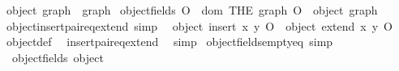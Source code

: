 \begin{isabellebody}
\begin{isamarkuptext}
\end{isamarkuptext}\isamarkuptrue%
%
\isadelimdocument
%
\endisadelimdocument
%
\isatagdocument
%
\isamarkuptrue%
%
\endisatagdocument
{\isafolddocument}%
%
\isadelimdocument
%
\endisadelimdocument
{}\isamarkupfalse%
\ {\isachardoublequoteopen}object\ graph\ {\isacharequal}{\kern0pt}\ graph{\isachardoublequoteclose}%
\isadelimdocument
%
\endisadelimdocument
%
\isatagdocument
%
\isamarkuptrue%
%
\endisatagdocument
{\isafolddocument}%
%
\isadelimdocument
%
\endisadelimdocument
{}\isamarkupfalse%
\ {\isachardoublequoteopen}object{\isacharunderscore}{\kern0pt}fields\ O\ {\isacharequal}{\kern0pt}\ dom\ {\isacharparenleft}{\kern0pt}THE\ graph{\isachardot}{\kern0pt}\ O\ {\isacharequal}{\kern0pt}\ object\ graph{\isacharparenright}{\kern0pt}{\isachardoublequoteclose}\isanewline
\isanewline
{}\isamarkupfalse%
\ object{\isacharunderscore}{\kern0pt}insert{\isacharunderscore}{\kern0pt}pair{\isacharunderscore}{\kern0pt}eq{\isacharunderscore}{\kern0pt}extend\ {\isacharbrackleft}{\kern0pt}simp{\isacharbrackright}{\kern0pt}{\isacharcolon}{\kern0pt}\isanewline
\ \ {\isachardoublequoteopen}object\ {\isacharparenleft}{\kern0pt}insert\ {\isasymlangle}x{\isacharcomma}{\kern0pt}\ y{\isasymrangle}\ O{\isacharparenright}{\kern0pt}\ {\isacharequal}{\kern0pt}\ object\ {\isacharparenleft}{\kern0pt}extend\ x\ y\ O{\isacharparenright}{\kern0pt}{\isachardoublequoteclose}\isanewline
%
\isadelimproof
\ \ %
\endisadelimproof
%
\isatagproof
{}\isamarkupfalse%
\ object{\isacharunderscore}{\kern0pt}def\ \isamarkupfalse%
\ insert{\isacharunderscore}{\kern0pt}pair{\isacharunderscore}{\kern0pt}eq{\isacharunderscore}{\kern0pt}extend\ \isamarkupfalse%
\ simp%
\endisatagproof
{\isafoldproof}%
%
\isadelimproof
\isanewline
%
\endisadelimproof
\isanewline
{}\isamarkupfalse%
\ object{\isacharunderscore}{\kern0pt}fields{\isacharunderscore}{\kern0pt}empty{\isacharunderscore}{\kern0pt}eq\ {\isacharbrackleft}{\kern0pt}simp{\isacharbrackright}{\kern0pt}{\isacharcolon}{\kern0pt}\isanewline
\ \ {\isachardoublequoteopen}object{\isacharunderscore}{\kern0pt}fields\ {\isacharparenleft}{\kern0pt}object\ {\isacharbraceleft}{\kern0pt}{\isacharbraceright}{\kern0pt}{\isacharparenright}{\kern0pt}\ {\isacharequal}{\kern0pt}\ {\isacharbraceleft}{\kern0pt}{\isacharbraceright}{\kern0pt}{\isachardoublequoteclose}\isanewline
%
\isadelimproof
\ \ %
\endisadelimproof
%
\isatagproof

\end{isabellebody}
